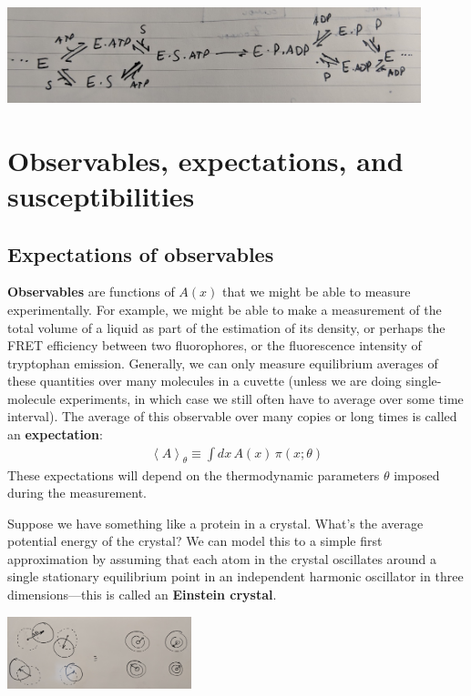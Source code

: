 \documentclass[english,course]{lecture}
\begin{document}
\begin{centering}
\includegraphics[width=0.9\textwidth]{figures/enzyme-schema.jpg}

\end{centering}

\section{Observables, expectations, and susceptibilities}

\subsection{Expectations of observables}

{\bf Observables} are functions of $A(x)$ that we might be able to measure experimentally.
For example, we might be able to make a measurement of the total volume of a liquid as part of the estimation of its density, or perhaps the FRET efficiency between two fluorophores, or the fluorescence intensity of tryptophan emission.
Generally, we can only measure equilibrium averages of these quantities over many molecules in a cuvette (unless we are doing single-molecule experiments, in which case we still often have to average over some time interval).
The average of this observable over many copies or long times is called an {\bf expectation}:
\begin{eqnarray}
\left< A \right>_\theta \equiv \int dx \, A(x) \, \pi(x; \theta)
\end{eqnarray}
These expectations will depend on the thermodynamic parameters $\theta$ imposed during the measurement.

Suppose we have something like a protein in a crystal.
What's the average potential energy of the crystal?
We can model this to a simple first approximation by assuming that each atom in the crystal oscillates around a single stationary equilibrium point in an independent harmonic oscillator in three dimensions---this is called an {\bf Einstein crystal}.

\begin{centering}
\includegraphics[width=0.4\textwidth]{figures/einstein-crystal.jpg}

\end{centering}
\end{document}
